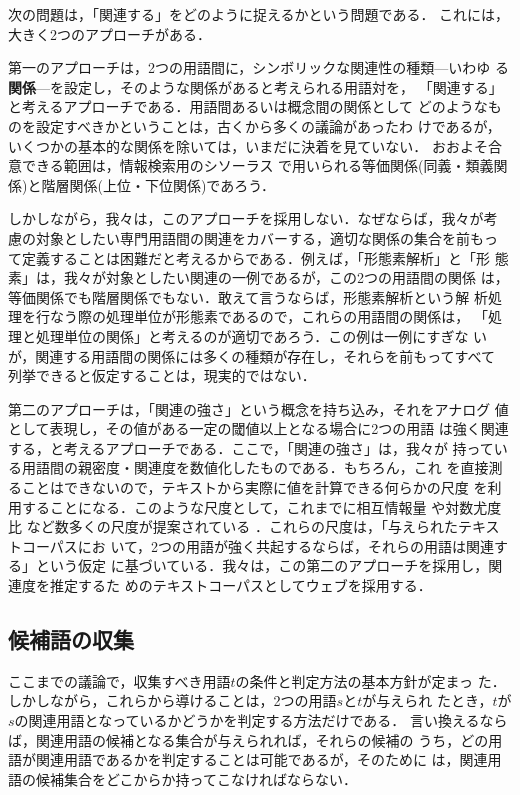 次の問題は，「関連する」をどのように捉えるかという問題である．
これには，大きく2つのアプローチがある．

第一のアプローチは，2つの用語間に，シンボリックな関連性の種類---いわゆ
る{\bf 関係}---を設定し，そのような関係があると考えられる用語対を，
「関連する」と考えるアプローチである．用語間あるいは概念間の関係として
どのようなものを設定すべきかということは，古くから多くの議論があったわ
けであるが，いくつかの基本的な関係を除いては，いまだに決着を見ていない．
おおよそ合意できる範囲は，情報検索用のシソーラス\cite{thesaurus}
で用いられる等価関係(同義・類義関係)と階層関係(上位・下位関係)であろう．

しかしながら，我々は，このアプローチを採用しない．なぜならば，我々が考
慮の対象としたい専門用語間の関連をカバーする，適切な関係の集合を前もっ
て定義することは困難だと考えるからである．例えば，「形態素解析」と「形
態素」は，我々が対象としたい関連の一例であるが，この2つの用語間の関係
は，等価関係でも階層関係でもない．敢えて言うならば，形態素解析という解
析処理を行なう際の処理単位が形態素であるので，これらの用語間の関係は，
「処理と処理単位の関係」と考えるのが適切であろう．この例は一例にすぎな
いが，関連する用語間の関係には多くの種類が存在し，それらを前もってすべて
列挙できると仮定することは，現実的ではない．

第二のアプローチは，「関連の強さ」という概念を持ち込み，それをアナログ
値として表現し，その値がある一定の閾値以上となる場合に2つの用語
は強く関連する，と考えるアプローチである．ここで，「関連の強さ」は，我々が
持っている用語間の親密度・関連度を数値化したものである．もちろん，これ
を直接測ることはできないので，テキストから実際に値を計算できる何らかの尺度
を利用することになる．このような尺度として，これまでに相互情報量
\cite{church89word_association}や対数尤度比
\cite{dunning93accurate_methods}など数多くの尺度が提案されている
\cite{manning99fsnlp}．これらの尺度は，「与えられたテキストコーパスにお
いて，2つの用語が強く共起するならば，それらの用語は関連する」という仮定
に基づいている．我々は，この第二のアプローチを採用し，関連度を推定するた
めのテキストコーパスとしてウェブを採用する．


\subsection{候補語の収集}\label{sec:candidate}

ここまでの議論で，収集すべき用語$t$の条件と判定方法の基本方針が定まっ
た．しかしながら，これらから導けることは，2つの用語$s$と$t$が与えられ
たとき，$t$が$s$の関連用語となっているかどうかを判定する方法だけである．
言い換えるならば，関連用語の候補となる集合が与えられれば，それらの候補の
うち，どの用語が関連用語であるかを判定することは可能であるが，そのために
は，関連用語の候補集合をどこからか持ってこなければならない．

